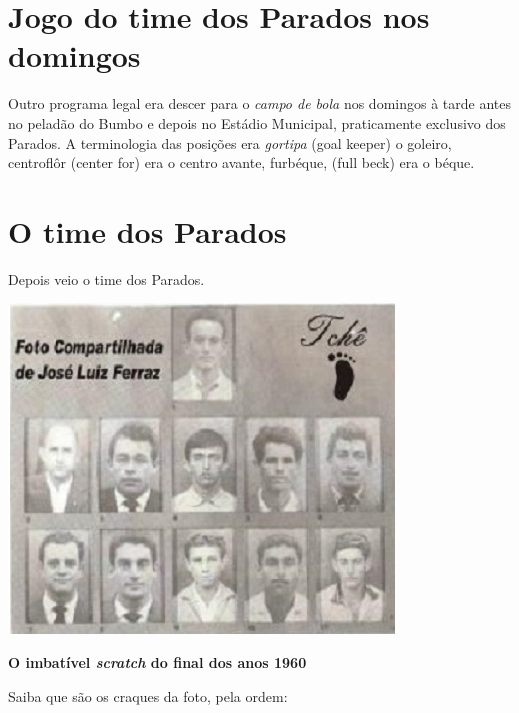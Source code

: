 \documentclass[12pt,brazil,]{book}
\begin{document}
\section{Jogo do time dos Parados nos
domingos}\label{jogo-do-time-dos-parados-nos-domingos}

Outro programa legal era descer para o \emph{campo de bola} nos domingos
à tarde antes no peladão do Bumbo e depois no Estádio Municipal,
praticamente exclusivo dos Parados. A terminologia das posições era
\emph{gortipa} (goal keeper) o goleiro, centroflôr (center for) era o
centro avante, furbéque, (full beck) era o béque.

\section{O time dos Parados}\label{o-time-dos-parados}

Depois veio o time dos Parados.

\includegraphics{Imagens/time dos Parados2.jpeg}

\textbf{O imbatível \emph{scratch} do final dos anos 1960}

Saiba que são os craques da foto, pela ordem:
\end{document}
